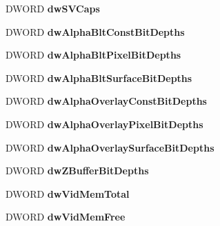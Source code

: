 \begin{DoxyCompactItemize}
D\+W\+O\+RD {\bfseries dw\+S\+V\+Caps}
\item 
\mbox{\label{struct___d_d_n_t_c_o_r_e_c_a_p_s_ab64e20006059046c9209f80b8aacdd04}} 
D\+W\+O\+RD {\bfseries dw\+Alpha\+Blt\+Const\+Bit\+Depths}
\item 
\mbox{\label{struct___d_d_n_t_c_o_r_e_c_a_p_s_a9b240132285493122a426428c6c7692e}} 
D\+W\+O\+RD {\bfseries dw\+Alpha\+Blt\+Pixel\+Bit\+Depths}
\item 
\mbox{\label{struct___d_d_n_t_c_o_r_e_c_a_p_s_ae8922ac61cdc52aa3143628d8e2176c8}} 
D\+W\+O\+RD {\bfseries dw\+Alpha\+Blt\+Surface\+Bit\+Depths}
\item 
\mbox{\label{struct___d_d_n_t_c_o_r_e_c_a_p_s_a81c19ce24ff5e1d813918bd8758ae133}} 
D\+W\+O\+RD {\bfseries dw\+Alpha\+Overlay\+Const\+Bit\+Depths}
\item 
\mbox{\label{struct___d_d_n_t_c_o_r_e_c_a_p_s_a10dc0f21d89ee16c97e1d9105ea552af}} 
D\+W\+O\+RD {\bfseries dw\+Alpha\+Overlay\+Pixel\+Bit\+Depths}
\item 
\mbox{\label{struct___d_d_n_t_c_o_r_e_c_a_p_s_a283d10e540a550f1685239f09bfeb98d}} 
D\+W\+O\+RD {\bfseries dw\+Alpha\+Overlay\+Surface\+Bit\+Depths}
\item 
\mbox{\label{struct___d_d_n_t_c_o_r_e_c_a_p_s_a32ea963a8cfcc7c6677811983f54fea6}} 
D\+W\+O\+RD {\bfseries dw\+Z\+Buffer\+Bit\+Depths}
\item 
\mbox{\label{struct___d_d_n_t_c_o_r_e_c_a_p_s_ad1a7270c7a33507e61f70aefae1907ba}} 
D\+W\+O\+RD {\bfseries dw\+Vid\+Mem\+Total}
\item 
\mbox{\label{struct___d_d_n_t_c_o_r_e_c_a_p_s_a1b52fe968aa6e3d0c03d97233250b8e8}} 
D\+W\+O\+RD {\bfseries dw\+Vid\+Mem\+Free}
\item 
\mbox{\label{struct___d_d_n_t_c_o_r_e_c_a_p_s_a786aad6ab199ba253d46af3dd6c4d095}} 

\end{DoxyCompactItemize}
